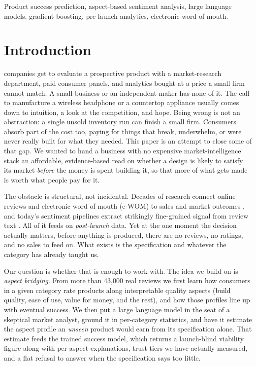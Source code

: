 \documentclass[journal]{IEEEtran}
\begin{document}
\begin{IEEEkeywords}
Product success prediction, aspect-based sentiment analysis, large language models, gradient boosting, pre-launch analytics, electronic word of mouth.
\end{IEEEkeywords}

\section{Introduction}
 companies get to evaluate a prospective product with a market-research department, paid consumer panels, and analytics bought at a price a small firm cannot match. A small business or an independent maker has none of it. The call to manufacture a wireless headphone or a countertop appliance usually comes down to intuition, a look at the competition, and hope. Being wrong is not an abstraction: a single unsold inventory run can finish a small firm. Consumers absorb part of the cost too, paying for things that break, underwhelm, or were never really built for what they needed. This paper is an attempt to close some of that gap. We wanted to hand a business with no expensive market-intelligence stack an affordable, evidence-based read on whether a design is likely to satisfy its market \emph{before} the money is spent building it, so that more of what gets made is worth what people pay for it.

The obstacle is structural, not incidental. Decades of research connect online reviews and electronic word of mouth (e-WOM) to sales and market outcomes \cite{chevalier2006wom,dellarocas2003digitization,chintagunta2010effects,luca2016reviews}, and today's sentiment pipelines extract strikingly fine-grained signal from review text \cite{zhang2022survey,wang2025multifeature,shan2025bilingual}. All of it feeds on \emph{post-launch} data. Yet at the one moment the decision actually matters, before anything is produced, there are no reviews, no ratings, and no sales to feed on. What exists is the specification and whatever the category has already taught us.

Our question is whether that is enough to work with. The idea we build on is \emph{aspect bridging}. From more than 43{,}000 real reviews we first learn how consumers in a given category rate products along interpretable quality aspects (build quality, ease of use, value for money, and the rest), and how those profiles line up with eventual success. We then put a large language model in the seat of a skeptical market analyst, ground it in per-category statistics, and have it estimate the aspect profile an \emph{unseen} product would earn from its specification alone. That estimate feeds the trained success model, which returns a launch-blind viability figure along with per-aspect explanations, trust tiers we have actually measured, and a flat refusal to answer when the specification says too little.
\end{document}
